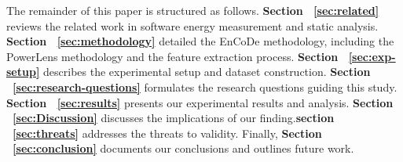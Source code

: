 The remainder of this paper is structured as follows. \textbf{Section ~\ref{sec:related}} reviews the related work in software energy measurement and static analysis. \textbf{Section ~\ref{sec:methodology}} detailed the EnCoDe methodology, including the PowerLens methodology and the feature extraction process. \textbf{Section ~\ref{sec:exp-setup}} describes the experimental setup and dataset construction. \textbf{Section ~\ref{sec:research-questions}} formulates the research questions guiding this study. \textbf{Section ~\ref{sec:results}} presents our experimental results and analysis. \textbf{Section ~\ref{sec:Discussion}} discusses the implications of our finding.\textbf{section ~\ref{sec:threats}} addresses the threats to validity. Finally, \textbf{Section ~\ref{sec:conclusion}} documents our conclusions and outlines future work. 


